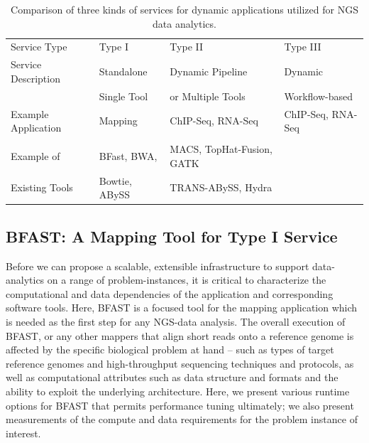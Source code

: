 \documentclass{cpeauth}
\begin{document}
\begin{table}[!h]
\begin{center}
 \caption{Comparison of three kinds of services for dynamic applications utilized for NGS data analytics. %
 }
 \begin{tabular}{| l | l | l | l |} \hline \rowcolor[rgb]{0.8,0.8,0.8}
   Service Type &
   Type I & Type II & Type III \\ 

   Service Description & Standalone  & Dynamic Pipeline & Dynamic \\
               & Single Tool & or Multiple Tools & Workflow-based \\\hline
 Example Application & Mapping & ChIP-Seq, RNA-Seq & ChIP-Seq, RNA-Seq \\ 
  & & & \\ \hline 

  Example of & BFast, BWA, & MACS, TopHat-Fusion, GATK& 
   \\
   Existing Tools &  Bowtie, ABySS  & TRANS-ABySS, Hydra & \\
   \hline
\end{tabular}
\label{table:three-type-service}
\end{center}
\end{table}


\subsection{BFAST: A Mapping Tool for Type I Service}

Before we can propose a scalable, extensible infrastructure to support
data-analytics on a range of problem-instances, it is critical to
characterize the computational and data dependencies of the application and corresponding software tools.
Here, BFAST is a focused tool for the mapping application which is needed as the first step for any NGS-data analysis.  The overall execution of BFAST, or any other mappers that align short reads onto a reference genome is
affected by the specific biological problem at hand -- such as types
of target reference genomes and high-throughput sequencing techniques
and protocols, as well as computational attributes such as data
structure and formats and the ability to exploit the underlying
architecture.  Here, we present various runtime options for BFAST that permits performance tuning ultimately; we also present measurements of the compute and data requirements for the problem instance of interest.
\end{document}
